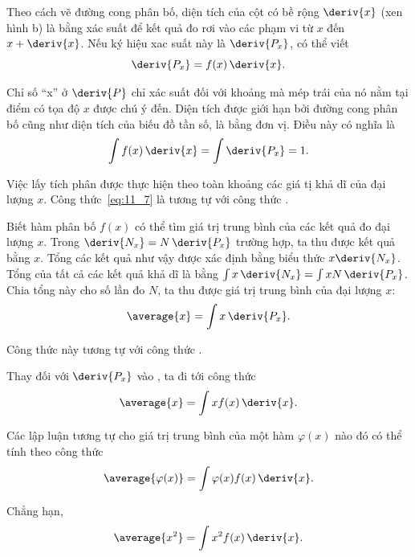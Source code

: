 Theo cách vẽ đường cong phân bố, diện tích của cột có bề rộng $\deriv{x}$ (xen hình b) là bằng xác suất để kết quả đo rơi vào các phạm vi từ $x$ đến $x+\deriv{x}$. Nếu ký hiệu xac suất này là $\deriv{P_x}$, có thể viết
\begin{equation}\label{eq:11_6}
	\deriv{P_x} = f(x)\,\deriv{x}.
\end{equation}

\noindent
Chỉ số ``x'' ở $\deriv{P}$ chỉ xác suất đối với khoảng mà mép trái của nó nằm tại điểm có tọa độ $x$ được chú ý đến. Diện tích được giới hạn bởi đường cong phân bố cũng như diện tích của biếu đồ tần số, là bằng đơn vị. Điều này có nghĩa là
\begin{equation}\label{eq:11_7}
	\int f(x)\,\deriv{x} = \int \deriv{P_x} = 1.
\end{equation}

\noindent

Việc lấy tích phân được thực hiện theo toàn khoảng các giá tị khả dĩ của đại lượng $x$. Công thức~\eqref{eq:11_7} là tương tự với công thức .

Biết hàm phân bố $f(x)$ có thể tìm giá trị trung bình của các kết quả đo đại lượng $x$. Trong $\deriv{N_x}=N\,\deriv{P_x}$ trường hợp, ta thu được kết quả bằng $x$. Tổng các kết quả  như vậy được xác định bằng biểu thức $x\deriv{N_x}$. Tổng của tất cả các kết quả khả dĩ là bằng $\int x\,\deriv{N_x}=\int xN\,\deriv{P_x}$. Chia tổng này cho số lần đo $N$, ta thu được giá trị trung bình của đại lượng $x$:
\begin{equation}\label{eq:11_8} 
	\average{x} = \int x\,\deriv{P_x}.
\end{equation}

\noindent
Công thức này tương tự với công thức .

Thay  đối với $\deriv{P_x}$ vào , ta đi tới công thức
\begin{equation}\label{eq:11_9}
	\average{x} = \int x f(x)\,\deriv{x}.
\end{equation}

Các lập luận tương tự cho giá trị trung bình của một hàm $\varphi(x)$ nào đó có thể tính theo công thức 
\begin{equation}\label{eq:11_10}
	\average{\varphi(x)} = \int \varphi(x) f(x)\,\deriv{x}.
\end{equation}

\noindent
Chẳng hạn,
\begin{equation}\label{eq:11_11}
	\average{x^2} = \int x^2 f(x)\,\deriv{x}.
\end{equation}

